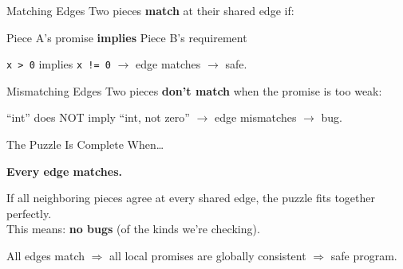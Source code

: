 \documentclass[aspectratio=169,10pt]{beamer}
\newcommand{\hint}[1]{\begin{center}
  \colorbox{hintbg}{\parbox{0.88\textwidth}{\centering\small #1}}\end{center}}
\begin{document}
\begin{frame}{Matching Edges}
Two pieces \textbf{match} at their shared edge if:
\vspace{0.3em}
\begin{center}
Piece A's promise \textbf{implies} Piece B's requirement
\end{center}
\vspace{0.5em}
\begin{center}
\end{center}
\vspace{0.3em}
\texttt{x > 0} implies \texttt{x != 0} $\to$ edge matches $\to$ \textcolor{safe}{safe}.
\end{frame}

\begin{frame}{Mismatching Edges}
Two pieces \textbf{don't match} when the promise is too weak:
\vspace{0.5em}
\begin{center}
\end{center}
\vspace{0.3em}
``int'' does NOT imply ``int, not zero'' $\to$ edge mismatches $\to$ \textcolor{danger}{bug}.
\end{frame}

\begin{frame}{The Puzzle Is Complete When\ldots}
\begin{center}
\Large\bfseries
Every edge matches.
\end{center}
\vspace{0.5em}
\normalsize
If all neighboring pieces agree at every shared edge, the puzzle fits together perfectly.\\[0.3em]
This means: \textbf{no bugs} (of the kinds we're checking).
\hint{All edges match $\Rightarrow$ all local promises are globally consistent $\Rightarrow$ safe program.}
\end{frame}
\end{document}
